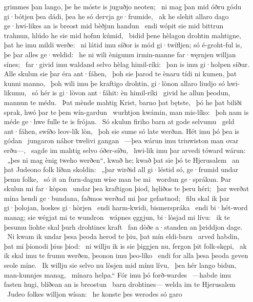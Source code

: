 grimmes þan lango, þe he móste is juguðjo neoten; \hld\ ni mag þan mid óðru gódu gi·bótjen
þea dádi, þea he só dervja ge·frumide, \hld\ ak he slehit allaro dago ge·hwi-likes
an is breost mid bèðjun handun \hld\ endi wópit sie mid bittrun trahnun,
hlúdo he sie mid hofnu kúmid, \hld\ bidid þene hèlagon drohtin
mahtigne, þat he imu mildi werðe: \hld\ ni látid imu síðor is mód gi·twífljen;
só é-groht-ful is, þe þar alles ge·weldid: \hld\ he ni wili ènigumu irmin-manne
far·węrnjen willjan sínes; \hld\ far·givid imu waldand selvo
hèlag himil-ríki: \hld\ þan is imu gi·holpen síður.
Alle skulun sie þar éra ant·fáhen, \hld\ þoh sie þarod te ènaru tídi
ni kumen, þat kunni manno, \hld\ þoh wili imu þe kraftigo drohtin,
gi·lònon allaro liudjo só hwi-likumu, \hld\ só hér is gi·lòvon ant·fáhit:
èn himil-ríki \hld\ givid he allun þeodun,
mannun te médu. \hld\ Þat mènde mahtig Krist,
barno þat bętste, \hld\ þó he þat biliði sprak,
hwó þar te þem wín-gardun \hld\ wurhtjon kwámin,
man mis-líko: \hld\ þoh nam is méde ge·hwe
fulle te is frójan. \hld\ Só skulun firiho barn
at gode selvumu \hld\ geld ant·fáhen,
swíðo leov-lík lòn, \hld\ þoh sie sume só late werðan.
Hét imu þó þea is gódan \hld\ jungaron náhor
twelivi gangan \hld\ —þea wárun imu triuwiston
man ovar erðu—, \hld\ sagde im mahtig selvo
óðer-síðu, \hld\ hwi-lik imu þar arvedi
tóward wárun: \hld\ „þes ni mag ènig tweho werðen“, kwað he;
kwað þat sie þó te Hjerusalem \hld\ an þat Judeono folk
líðan skoldin: \hld\ „þar wirðid all gi·léstid só,
ge·frumid undar þemu folke, \hld\ só it an furn-dagun
wíse man be mi \hld\ wordun ge·sprákun.
Þar skulun mi far·kòpon \hld\ undar þea kraftigon þiod,
hęliðos te þeru héri; \hld\ þar werðat mína hendi ge·bundana,
faðmos werðad mi þar gefastnod; \hld\ filu skal ik þar gi·þolojan,
hoskes gi·hòrjen \hld\ endi harm-kwidi,
bismerspráka \hld\ endi bi·hét-word manag;
sie wégjat mi te wundron \hld\ wápnes ęggjun,
bi·lòsjad mi lívu: \hld\ ik te þesumu liohte skal
þurh drohtines kraft \hld\ fan dòðe a·standen
an þriddjon dage. \hld\ Ni kwam ik undar þesa þeoda herod
te þiu, þat mín eldi-barn \hld\ arved habdin,
þat mi þionodi þius þiod: \hld\ ni willju ik is sie þiggjen nu,
fergon þit folk-skępi, \hld\ ak ik skal imu te frumu werðen,
þeonon imu þeo-líko \hld\ endi for alla þesa þeoda geven
seole míne. \hld\ Ik willju sie selvo nu
lòsjen mid mínu lívu, \hld\ þea hér lango bidun,
man-kunnjes manag, \hld\ mínara helpa.“
Fór imu þó forð-wardes \hld\ —habde imu fasten hugi,
blíðean an is breostun \hld\ barn drohtines—
welda im te Hjerusalem \hld\ Judeo folkes
willjon wísan: \hld\ he konste þes werodes só garo
